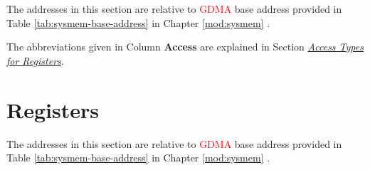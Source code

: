 \documentclass[main\_\_EN.tex]{subfiles}
\begin{document}
The addresses in this section are relative to \textcolor{red}{GDMA} base address provided in Table \ref{tab:sysmem-base-address} in Chapter \ref{mod:sysmem} \textit{}.

The abbreviations given in Column \textbf{Access} are explained in Section \hyperref[glossary-access-types]{\textit{Access Types for Registers}}.






\clearpage
\section{Registers}

The addresses in this section are relative to \textcolor{red}{GDMA} base address provided in Table \ref{tab:sysmem-base-address} in Chapter \ref{mod:sysmem} \textit{}.


\end{document}
